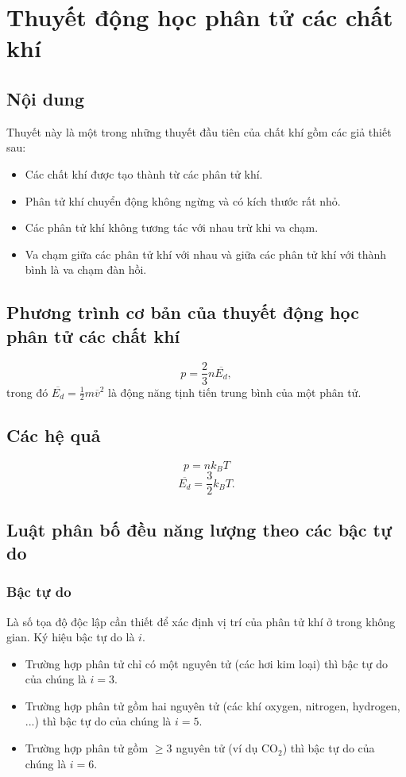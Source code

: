 \section{Thuyết động học phân tử các chất khí}
\subsection{Nội dung}
Thuyết này là một trong những thuyết đầu tiên của chất khí gồm các giả thiết sau:
\begin{itemize}
\item Các chất khí được tạo thành từ các phân tử khí.
\item Phân tử khí chuyển động không ngừng và có kích thước rất nhỏ.
\item Các phân tử khí không tương tác với nhau trừ khi va chạm.
\item Va chạm giữa các phân tử khí với nhau và giữa các phân tử khí với thành bình là va chạm đàn hồi.
\end{itemize}
\subsection{Phương trình cơ bản của thuyết động học phân tử các chất khí}
$$p = \frac{2}{3}n \overline{E_d},$$
trong đó $\overline{E_d} = \frac{1}{2} m \overline{v}^2$ là động năng tịnh tiến trung bình của một phân tử.
\subsection{Các hệ quả}
$$p = n k_B T$$
$$\overline{E_d} = \frac{3}{2} k_B T.$$
\subsection{Luật phân bố đều năng lượng theo các bậc tự do}
\subsubsection{Bậc tự do}
Là số tọa độ độc lập cần thiết để xác định vị trí của phân tử khí ở trong không gian. Ký hiệu bậc tự do là $i.$
\begin{itemize}
\item Trường hợp phân tử chỉ có một nguyên tử (các hơi kim loại) thì bậc tự do của chúng là $i = 3.$
\item Trường hợp phân tử gồm hai nguyên tử (các khí oxygen, nitrogen, hydrogen, ...) thì bậc tự do của chúng là $i = 5.$
\item Trường hợp phân tử gồm $\geqslant 3$ nguyên tử (ví dụ $\mathrm{CO_2}$) thì bậc tự do của chúng là $i = 6.$
\end{itemize}

